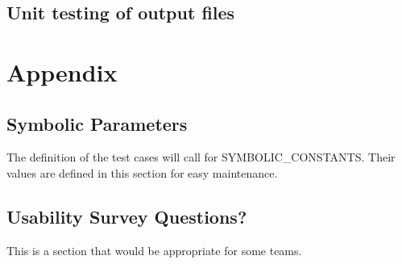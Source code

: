 \documentclass[12pt, titlepage]{article}
\begin{document}
		
\subsection{Unit testing of output files}		






\newpage

\section{Appendix}

\subsection{Symbolic Parameters}

The definition of the test cases will call for SYMBOLIC\_CONSTANTS.
Their values are defined in this section for easy maintenance.

\subsection{Usability Survey Questions?}

This is a section that would be appropriate for some teams.
\end{document}
